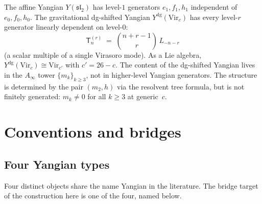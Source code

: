\begin{remark}
\label{rem:gravitational-yangian-collapse}
The affine Yangian $Y(\mathfrak{sl}_2)$ has level-$1$ generators
$e_1, f_1, h_1$ independent of $e_0, f_0, h_0$. The gravitational
dg-shifted Yangian $Y^{\mathrm{dg}}(\mathrm{Vir}_c)$ has every
level-$r$ generator linearly dependent on level-$0$:
\[
\mathsf{T}_n^{(r)} \;=\; \binom{n+r-1}{r}\,L_{-n-r}
\]
\textup{(}a scalar multiple of a single Virasoro mode\textup{)}.
As a Lie algebra, $Y^{\mathrm{dg}}(\mathrm{Vir}_c) \cong
\mathrm{Vir}_{c'}$ with $c' = 26 - c$. The content of the dg-shifted
Yangian lives in the $A_\infty$ tower $\{m_k\}_{k \ge 3}$, not in
higher-level Yangian generators. The structure is determined by the
pair $(m_2, h)$ via the resolvent tree formula, but is not finitely
generated: $m_k \ne 0$ for all $k \ge 3$ at generic~$c$.
\end{remark}

\section{Conventions and bridges}
\label{sec:dg-shifted-bridge-conventions}

\subsection{Four Yangian types}
\label{subsec:dg-shifted-bridge-yangian-types}

Four distinct objects share the name Yangian in the literature. The
bridge target of the construction here is one of the four, named
below.

